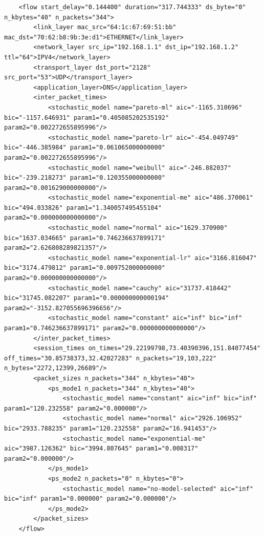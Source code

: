 \begin{verbatim}
    <flow start_delay="0.144400" duration="317.744333" ds_byte="0" n_kbytes="40" n_packets="344">
        <link_layer mac_src="64:1c:67:69:51:bb" mac_dst="70:62:b8:9b:3e:d1">ETHERNET</link_layer>
        <network_layer src_ip="192.168.1.1" dst_ip="192.168.1.2" ttl="64">IPV4</network_layer>
        <transport_layer dst_port="2128" src_port="53">UDP</transport_layer>
        <application_layer>DNS</application_layer>
        <inter_packet_times>
            <stochastic_model name="pareto-ml" aic="-1165.310696" bic="-1157.646931" param1="0.405085202535192" param2="0.002272655895996"/>
            <stochastic_model name="pareto-lr" aic="-454.049749" bic="-446.385984" param1="0.061065000000000" param2="0.002272655895996"/>
            <stochastic_model name="weibull" aic="-246.882037" bic="-239.218273" param1="0.120355000000000" param2="0.001629000000000"/>
            <stochastic_model name="exponential-me" aic="486.370061" bic="494.033826" param1="1.340057495455104" param2="0.000000000000000"/>
            <stochastic_model name="normal" aic="1629.370900" bic="1637.034665" param1="0.746236637899171" param2="2.626808289821357"/>
            <stochastic_model name="exponential-lr" aic="3166.816047" bic="3174.479812" param1="0.009752000000000" param2="0.000000000000000"/>
            <stochastic_model name="cauchy" aic="31737.418442" bic="31745.082207" param1="0.000000000000194" param2="-3152.827055696396656"/>
            <stochastic_model name="constant" aic="inf" bic="inf" param1="0.746236637899171" param2="0.000000000000000"/>
        </inter_packet_times>
        <session_times on_times="29.22199798,73.40390396,151.84077454" off_times="30.85738373,32.42027283" n_packets="19,103,222" n_bytes="2272,12399,26689"/>
        <packet_sizes n_packets="344" n_kbytes="40">
            <ps_mode1 n_packets="344" n_kbytes="40">
                <stochastic_model name="constant" aic="inf" bic="inf" param1="120.232558" param2="0.000000"/>
                <stochastic_model name="normal" aic="2926.106952" bic="2933.788235" param1="120.232558" param2="16.941453"/>
                <stochastic_model name="exponential-me" aic="3987.126362" bic="3994.807645" param1="0.008317" param2="0.000000"/>
            </ps_mode1>
            <ps_mode2 n_packets="0" n_kbytes="0">
                <stochastic_model name="no-model-selected" aic="inf" bic="inf" param1="0.000000" param2="0.000000"/>
            </ps_mode2>
        </packet_sizes>
    </flow>
\end{verbatim}


